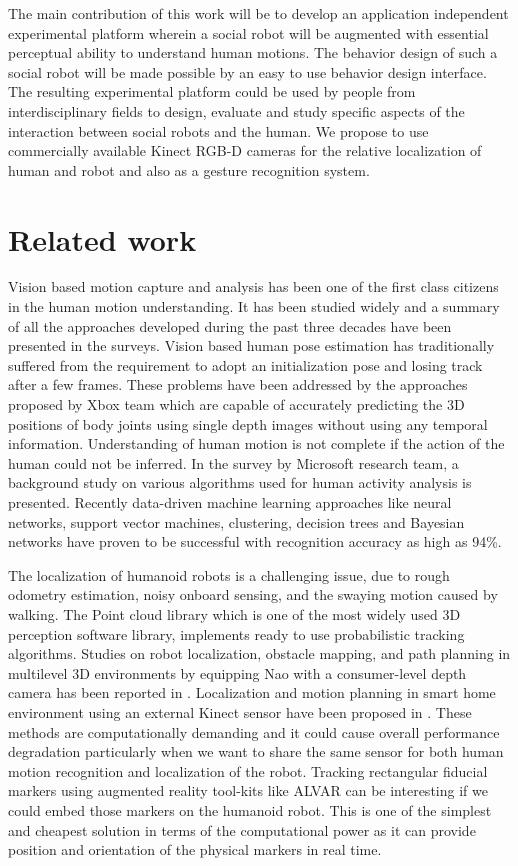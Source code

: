 \documentclass{llncs}
\begin{document}
The main contribution of this work will be to develop an application independent experimental platform wherein a social robot will be augmented with essential perceptual ability to understand human motions. The behavior design of such a social robot will be made possible by an easy to use behavior design interface. The resulting experimental platform could be used by people from interdisciplinary fields to design, evaluate and study specific aspects of the interaction between social robots and the human. We propose to use commercially available Kinect RGB-D cameras for the relative localization of human and robot and also as a gesture recognition system.
\section{Related work}
	Vision based motion capture and analysis has been one of the first class citizens in the human motion understanding. It has been studied widely and a summary of all the approaches developed during the past three decades have been presented in the surveys\cite{Moeslund200690}\cite{Poppe20074}. Vision based human pose estimation has traditionally suffered from the requirement to adopt an initialization pose and losing track after a few frames. These problems have been addressed by the approaches proposed by Xbox\cite{Kinect2014} team which are capable of accurately predicting the 3D positions of body joints using single depth images without using any temporal information\cite{Shotton2013}. Understanding of human motion is not complete if the action of the human could not be inferred. In the survey by Microsoft research team\cite{KinectCV2013}, a background study on various algorithms used for human activity analysis is presented. Recently data-driven machine learning approaches like neural networks, support vector machines, clustering, decision trees and Bayesian networks have proven to be successful with recognition accuracy as high as 94\%\cite{Kinect2014}.
	
	The localization of humanoid robots is a challenging issue, due to rough odometry estimation, noisy onboard sensing, and the swaying motion caused by walking\cite{Cervera2012}. The Point cloud library\cite{RusuPCL11} which is one of the most widely used 3D perception software library, implements ready to use probabilistic tracking algorithms\cite{RUeda2012}. Studies on robot localization, obstacle mapping, and path planning in multilevel 3D environments by equipping Nao with a consumer-level depth camera has been reported in \cite{Maier2012}. Localization and motion planning in smart home environment using an external Kinect sensor have been proposed in \cite{Cervera2012}. These methods are computationally demanding and it could cause overall performance degradation particularly when we want to share the same sensor for both human motion recognition and localization of the robot. Tracking rectangular fiducial markers using  augmented reality tool-kits like ALVAR\cite{ALVAR} can be interesting if we could embed those markers on the humanoid robot. This is one of the simplest and cheapest solution in terms of the computational power as it can provide position and orientation of the physical markers in real time.
	
\end{document}

